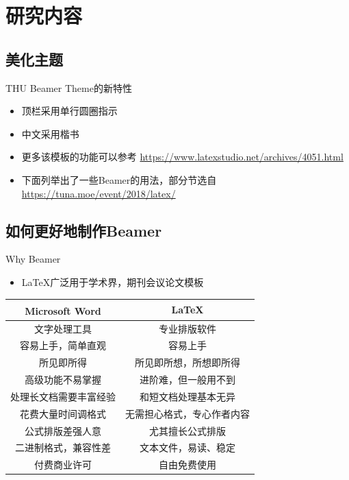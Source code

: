 \documentclass{beamer}
\begin{document}
	
	\section{研究内容}
	
	\subsection{美化主题}
	
	\begin{frame}{THU Beamer Theme的新特性}
		\begin{itemize}
			\item 顶栏采用单行圆圈指示
			\item 中文采用楷书
			\item 更多该模板的功能可以参考 \url{https://www.latexstudio.net/archives/4051.html}
			\item 下面列举出了一些Beamer的用法，部分节选自 \url{https://tuna.moe/event/2018/latex/}
		\end{itemize}
	\end{frame}
	
	\subsection{如何更好地制作Beamer}
	
	\begin{frame}{Why Beamer}
		\begin{itemize}
			\item \LaTeX 广泛用于学术界，期刊会议论文模板
		\end{itemize}
		\begin{table}[h]
			\centering
			\begin{tabular}{c|c}
				Microsoft\textsuperscript{\textregistered}  Word & \LaTeX \\
				\hline
				文字处理工具 & 专业排版软件 \\
				容易上手，简单直观 & 容易上手 \\
				所见即所得 & 所见即所想，所想即所得 \\
				高级功能不易掌握 & 进阶难，但一般用不到 \\
				处理长文档需要丰富经验 & 和短文档处理基本无异 \\
				花费大量时间调格式 & 无需担心格式，专心作者内容 \\
				公式排版差强人意 & 尤其擅长公式排版 \\
				二进制格式，兼容性差 & 文本文件，易读、稳定 \\
				付费商业许可 & 自由免费使用 \\
			\end{tabular}
		\end{table}
	\end{frame}
	
\end{document}
